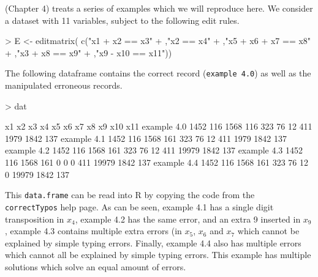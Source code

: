 \documentclass[11pt, fleqn, a4paper]{article}
\begin{document}
%
\cite{scholtus:2009} (Chapter 4) treats a series of examples which we will
reproduce here.  We consider a dataset with 11 variables, subject to the
following edit rules.
\begin{Schunk}
\begin{Sinput}
> E <- editmatrix( c("x1 + x2 == x3"
+                   ,"x2 == x4"
+                   ,"x5 + x6 + x7 == x8"
+                   ,"x3 + x8 == x9"
+                   ,"x9 - x10 == x11"))
\end{Sinput}
\end{Schunk}
%
The following dataframe contains the correct record ({\tt example 4.0}) as well
as the manipulated erroneous records.
\begin{Schunk}
\begin{Sinput}
> dat
\end{Sinput}
\begin{Soutput}
              x1  x2   x3  x4  x5 x6 x7  x8    x9  x10 x11
example 4.0 1452 116 1568 116 323 76 12 411  1979 1842 137
example 4.1 1452 116 1568 161 323 76 12 411  1979 1842 137
example 4.2 1452 116 1568 161 323 76 12 411 19979 1842 137
example 4.3 1452 116 1568 161   0  0  0 411 19979 1842 137
example 4.4 1452 116 1568 161 323 76 12   0 19979 1842 137
\end{Soutput}
\end{Schunk}
This {\tt data.frame} can be read into R by copying the code from the {\tt
correctTypos} help page. As can be seen, example 4.1 has a single digit
transposition in $x_4$, example 4.2 has the same error, and an extra 9 inserted
in $x_9$, example 4.3 contains multiple extra errors (in $x_5$, $x_6$ and $x_7$
which cannot be explained by simple typing errors.  Finally, example 4.4 also
has multiple errors which cannot all be explained by simple typing errors. This
example has multiple solutions which solve an equal amount of errors.
\end{document}
